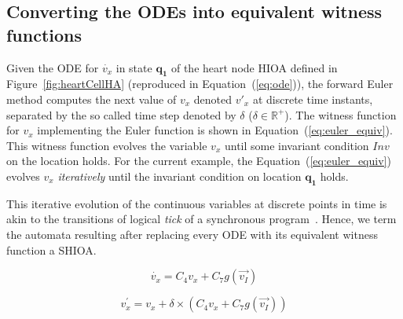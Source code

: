 \subsection{Converting the ODEs into equivalent witness functions}
\label{sec:converting-odes-into}

Given the \ac{ODE} for $\dot{v_x}$ in state $\mathbf{q_1}$ of the heart
node \ac{HIOA} defined in Figure~\ref{fig:heartCellHA} (reproduced in
Equation~(\ref{eq:ode})), the forward Euler method computes the next
value of $v_{x}$ denoted $v'_{x}$ at discrete time instants, separated
by the so called time step denoted by $\delta$
($\delta \in \mathbb{R}^{+}$). The witness function for $v_{x}$
implementing the Euler function is shown in
Equation~(\ref{eq:euler_equiv}). This witness function evolves the
variable $v_{x}$ until some invariant condition $Inv$ on the location
holds. For the current example, the Equation~(\ref{eq:euler_equiv})
evolves $v_{x}$ \emph{iteratively} until the invariant condition on
location $\mathbf{q_{1}}$ holds.

This iterative evolution of the continuous variables at discrete points
in time is akin to the transitions of logical \emph{tick} of a
synchronous program~\cite{benveniste03}. Hence, we term the automata
resulting after replacing every ODE with its equivalent witness function
a \acf{SHIOA}.


\begin{equation}
  \dot{v_x} = C_{4} v_x + C_{7} g(\vec{v_{I}})
  \label{eq:ode}
\end{equation}

\begin{equation}
  v^\prime_x = v_x + \delta \times (C_{4} v_x + C_{7} g(\vec{v_{I}}))
  \label{eq:euler_equiv}
\end{equation}


